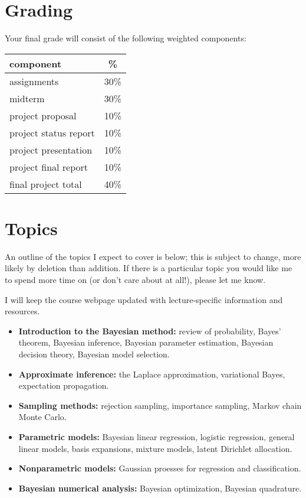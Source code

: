 \documentclass{article}
\begin{document}
\section*{Grading}

Your final grade will consist of the following weighted components:
\begin{center}
  \begin{tabular}{lc}
    \toprule
    component                    &   \% \\
    \midrule
    assignments                  & 30\% \\
    midterm                      & 30\% \\
    project proposal             & 10\% \\
    project status report        & 10\% \\
    project presentation         & 10\% \\
    project final report         & 10\% \\
    \midrule
    final project total          & 40\% \\
    \bottomrule
  \end{tabular}
\end{center}

\section*{Topics}

An outline of the topics I expect to cover is below; this is subject to change,
more likely by deletion than addition.  If there is a particular topic you would
like me to spend more time on (or don't care about at all!), please let me know.

I will keep the course webpage updated with lecture-specific information and
resources.

\begin{itemize}
\item \textbf{Introduction to the Bayesian method:} review of probability,
  Bayes' theorem, Bayesian inference, Bayesian parameter estimation, Bayesian
  decision theory, Bayesian model selection.
\item \textbf{Approximate inference:} the Laplace approximation, variational
  Bayes, expectation propagation.
\item \textbf{Sampling methods:} rejection sampling, importance sampling, Markov
  chain Monte Carlo.
\item \textbf{Parametric models:} Bayesian linear regression, logistic
  regression, general linear models, basis expansions, mixture models, latent
  Dirichlet allocation.
\item \textbf{Nonparametric models:} Gaussian proesses for regression and
  classification.
\item \textbf{Bayesian numerical analysis:} Bayesian optimization, Bayesian
  quadrature.
\end{itemize}
\end{document}
